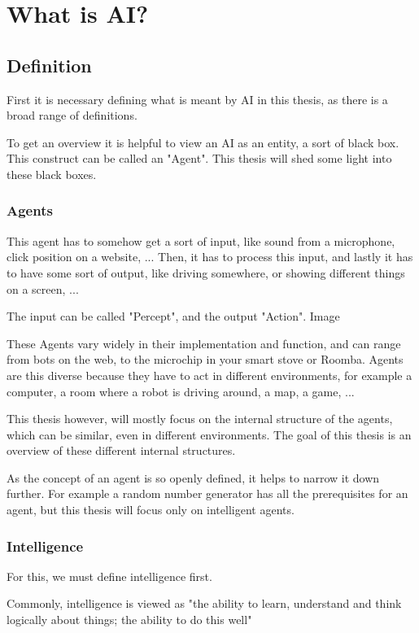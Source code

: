 \chapter{What is AI?}
\section{Definition}
First it is necessary defining what is meant by AI in this thesis, as there is a broad range of definitions.%

To get an overview it is helpful to view an AI as an entity, a sort of black box. This construct can be called an "Agent". 
This thesis will shed some light into these black boxes.

\subsection{Agents}
This agent has to somehow get a sort of input, like sound from a microphone, click position on a website, ... 
Then, it has to process this input, 
and lastly it has to have some sort of output, like driving somewhere, or showing different things on a screen, ... 

The input can be called "Percept", and the output "Action". %
Image

These Agents vary widely in their implementation and function, and can range from bots on the web, to the microchip in your smart stove or Roomba. 
Agents are this diverse because they have to act in different environments, for example a computer, a room where a robot is driving around, a map, a game, ...

This thesis however, will mostly focus on the internal structure of the agents, which can be similar, even in different environments.
The goal of this thesis is an overview of these different internal structures.

As the concept of an agent is so openly defined, it helps to narrow it down further. For example a random number generator has all the prerequisites for an agent, but this thesis will focus only on intelligent agents.

\subsection{Intelligence}
For this, we must define intelligence first.

Commonly, intelligence is viewed as "the ability to learn, understand and think logically about things; the ability to do this well" 


